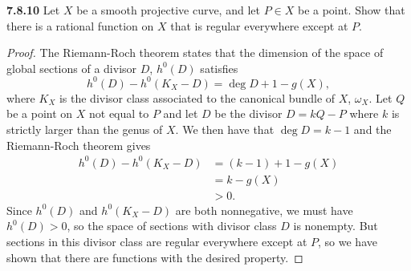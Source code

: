 \documentclass[11pt,letterpaper]{report}
\begin{document}
\noindent\textbf{7.8.10}
Let $X$ be a smooth projective curve, and let $P\in X$ be a point. Show that there is a rational function on $X$ that is regular everywhere except at $P$.
\begin{proof}
	The Riemann-Roch theorem states that the dimension of the space of global sections of a divisor $D$, $h^0(D)$ satisfies
	\[
	h^0(D) - h^0(K_X-D) = \deg D + 1 - g(X),
	\]
	where $K_X$ is the divisor class associated to the canonical bundle of $X$, $\omega_X$. Let $Q$ be a point on $X$ not equal to $P$ and let $D$ be the divisor $D = kQ - P$ where $k$ is strictly larger than the genus of $X$. We then have that $\deg D = k-1$ and the Riemann-Roch theorem gives
	\begin{align*}
	h^0(D) - h^0(K_X-D)&= (k-1)+1 - g(X)\\
	&=k-g(X)\\
	&>0.
	\end{align*}
	Since $h^0(D)$ and $h^0(K_X-D)$ are both nonnegative, we must have $h^0(D)>0$, so the space of sections with divisor class $D$ is nonempty. But sections in this divisor class are regular everywhere except at $P$, so we have shown that there are functions with the desired property.
\end{proof}
\end{document}
